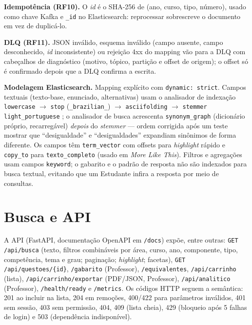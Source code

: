 \documentclass[12pt]{article}
\newcommand{\cod}[1]{\texttt{\small #1}}
\begin{document}
\textbf{Idempotência (RF10).} O \textit{id} é o SHA-256 de (ano, curso, tipo, número), usado como chave Kafka e
\cod{\_id} no Elasticsearch: reprocessar sobrescreve o documento em vez de duplicá-lo.

\textbf{DLQ (RF11).} JSON inválido, esquema inválido (campo ausente, campo desconhecido, \textit{id}
inconsistente) ou rejeição 4xx do mapping vão para a DLQ com cabeçalhos de diagnóstico (motivo, tópico,
partição e offset de origem); o offset só é confirmado depois que a DLQ confirma a escrita.

\textbf{Modelagem Elasticsearch.} Mapping explícito com \cod{dynamic: strict}. Campos textuais (texto-base,
enunciado, alternativas) usam o analisador de indexação \cod{lowercase} $\to$ \cod{stop}
(\cod{\_brazilian\_}) $\to$ \cod{asciifolding} $\to$ \cod{stemmer light\_portuguese} \cite{savoy2006light}; o
analisador de busca acrescenta \cod{synonym\_graph} (dicionário próprio, recarregável) \emph{depois} do
\textit{stemmer} --- ordem corrigida após um teste mostrar que ``desigualdade'' e ``desigualdades'' expandiam
sinônimos de forma diferente. Os campos têm \cod{term\_vector} com offsets para \textit{highlight} rápido e
\cod{copy\_to} para \cod{texto\_completo} (usado em \textit{More Like This}). Filtros e agregações usam campos
\cod{keyword}; o gabarito e o padrão de resposta não são indexados para busca textual, evitando que um
Estudante infira a resposta por meio de consultas.

\section{Busca e API}\label{sec:busca}

A API (FastAPI, documentação OpenAPI em \cod{/docs}) expõe, entre outras: \cod{GET /api/busca} (texto, filtros
combináveis por área, curso, ano, componente, tipo, competência, tema e grau; paginação; \textit{highlight};
facetas), \cod{GET /api/questoes/\{id\}}, \cod{/gabarito} (Professor), \cod{/equivalentes},
\cod{/api/carrinho} (lista), \cod{/api/carrinho/exportar} (PDF/JSON, Professor), \cod{/api/analitico}
(Professor), \cod{/health/ready} e \cod{/metrics}. Os códigos HTTP seguem a semântica: 201 ao incluir na lista,
204 em remoções, 400/422 para parâmetros inválidos, 401 sem sessão, 403 sem permissão, 404, 409 (lista cheia),
429 (bloqueio após 5 falhas de login) e 503 (dependência indisponível).
\end{document}
